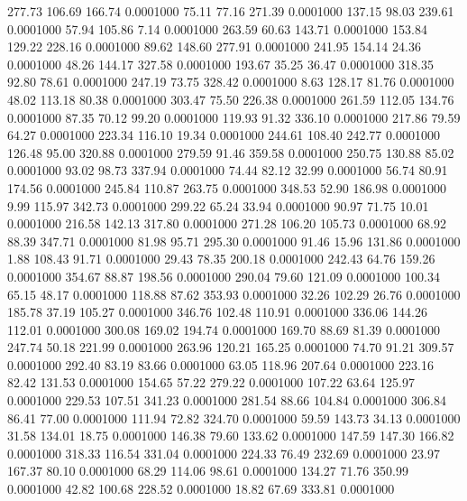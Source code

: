  277.73  106.69  166.74   0.0001000
  75.11   77.16  271.39   0.0001000
 137.15   98.03  239.61   0.0001000
  57.94  105.86    7.14   0.0001000
 263.59   60.63  143.71   0.0001000
 153.84  129.22  228.16   0.0001000
  89.62  148.60  277.91   0.0001000
 241.95  154.14   24.36   0.0001000
  48.26  144.17  327.58   0.0001000
 193.67   35.25   36.47   0.0001000
 318.35   92.80   78.61   0.0001000
 247.19   73.75  328.42   0.0001000
   8.63  128.17   81.76   0.0001000
  48.02  113.18   80.38   0.0001000
 303.47   75.50  226.38   0.0001000
 261.59  112.05  134.76   0.0001000
  87.35   70.12   99.20   0.0001000
 119.93   91.32  336.10   0.0001000
 217.86   79.59   64.27   0.0001000
 223.34  116.10   19.34   0.0001000
 244.61  108.40  242.77   0.0001000
 126.48   95.00  320.88   0.0001000
 279.59   91.46  359.58   0.0001000
 250.75  130.88   85.02   0.0001000
  93.02   98.73  337.94   0.0001000
  74.44   82.12   32.99   0.0001000
  56.74   80.91  174.56   0.0001000
 245.84  110.87  263.75   0.0001000
 348.53   52.90  186.98   0.0001000
   9.99  115.97  342.73   0.0001000
 299.22   65.24   33.94   0.0001000
  90.97   71.75   10.01   0.0001000
 216.58  142.13  317.80   0.0001000
 271.28  106.20  105.73   0.0001000
  68.92   88.39  347.71   0.0001000
  81.98   95.71  295.30   0.0001000
  91.46   15.96  131.86   0.0001000
   1.88  108.43   91.71   0.0001000
  29.43   78.35  200.18   0.0001000
 242.43   64.76  159.26   0.0001000
 354.67   88.87  198.56   0.0001000
 290.04   79.60  121.09   0.0001000
 100.34   65.15   48.17   0.0001000
 118.88   87.62  353.93   0.0001000
  32.26  102.29   26.76   0.0001000
 185.78   37.19  105.27   0.0001000
 346.76  102.48  110.91   0.0001000
 336.06  144.26  112.01   0.0001000
 300.08  169.02  194.74   0.0001000
 169.70   88.69   81.39   0.0001000
 247.74   50.18  221.99   0.0001000
 263.96  120.21  165.25   0.0001000
  74.70   91.21  309.57   0.0001000
 292.40   83.19   83.66   0.0001000
  63.05  118.96  207.64   0.0001000
 223.16   82.42  131.53   0.0001000
 154.65   57.22  279.22   0.0001000
 107.22   63.64  125.97   0.0001000
 229.53  107.51  341.23   0.0001000
 281.54   88.66  104.84   0.0001000
 306.84   86.41   77.00   0.0001000
 111.94   72.82  324.70   0.0001000
  59.59  143.73   34.13   0.0001000
  31.58  134.01   18.75   0.0001000
 146.38   79.60  133.62   0.0001000
 147.59  147.30  166.82   0.0001000
 318.33  116.54  331.04   0.0001000
 224.33   76.49  232.69   0.0001000
  23.97  167.37   80.10   0.0001000
  68.29  114.06   98.61   0.0001000
 134.27   71.76  350.99   0.0001000
  42.82  100.68  228.52   0.0001000
  18.82   67.69  333.81   0.0001000
